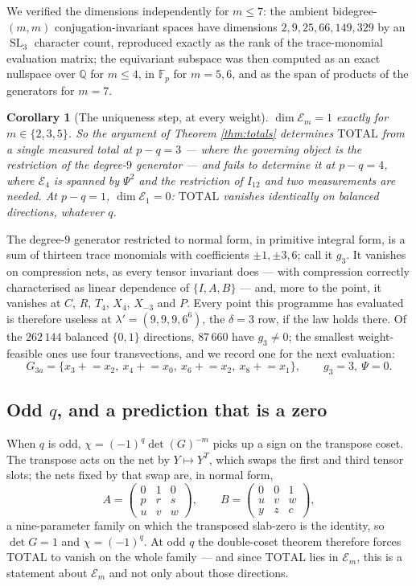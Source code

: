 \documentclass[11pt,reqno]{amsart}
\theoremstyle{plain}
\newtheorem{corollary}[theorem]{Corollary}
\theoremstyle{definition}
\DeclareMathOperator{\SL}{SL}
\begin{document}
We verified the dimensions independently for $m\le7$: the ambient bidegree-%
$(m,m)$ conjugation-invariant spaces have dimensions $2,9,25,66,149,329$ by an
$\SL_3$ character count, reproduced exactly as the rank of the trace-monomial
evaluation matrix; the equivariant subspace was then computed as an exact
nullspace over $\mathbb{Q}$ for $m\le4$, in $\mathbb{F}_p$ for $m=5,6$, and as the span of
products of the generators for $m=7$.

\begin{corollary}[The uniqueness step, at every weight]\label{cor:pquniq}
$\dim\mathcal E_m=1$ exactly for $m\in\{2,3,5\}$.  So the argument of Theorem
\ref{thm:totals} determines $\mathrm{TOTAL}$ from a single measured total at
$p-q=3$ --- where the governing object is the restriction of the degree-$9$
generator --- and fails to determine it at $p-q=4$, where $\mathcal E_4$ is
spanned by $\Psi^{2}$ and the restriction of $I_{12}$ and two measurements are
needed.  At $p-q=1$, $\dim\mathcal E_1=0$: $\mathrm{TOTAL}$ vanishes identically
on balanced directions, whatever $q$.
\end{corollary}

The degree-$9$ generator restricted to normal form, in primitive integral form,
is a sum of thirteen trace monomials with coefficients $\pm1,\pm3,6$; call it
$g_3$.  It vanishes on compression nets, as every tensor invariant does --- with
compression correctly characterised as linear dependence of $\{I,A,B\}$ --- and,
more to the point, it vanishes at $C$, $R$, $T_4$, $X_4$, $X_{-3}$ and $P$.
Every point this programme has evaluated is therefore useless at
$\lambda'=(9,9,9,6^{6})$, the $\delta=3$ row, if the law holds there.  Of the
$262\,144$ balanced $\{0,1\}$ directions, $87\,660$ have $g_3\neq0$; the smallest
weight-feasible ones use four transvections, and we record one for the next
evaluation:
\[
  G_{3a}=\{x_3\!+\!=\!x_2,\ x_4\!+\!=\!x_0,\ x_6\!+\!=\!x_2,\ x_8\!+\!=\!x_1\},
  \qquad g_3=3,\ \Psi=0 .
\]

\subsection*{Odd $q$, and a prediction that is a zero}

When $q$ is odd, $\chi=(-1)^{q}\det(G)^{-m}$ picks up a sign on the transpose
coset.  The transpose acts on the net by $Y\mapsto Y^{T}$, which swaps the first
and third tensor slots; the nets fixed by that swap are, in normal form,
\[
  A=\begin{pmatrix}0&1&0\\ p&r&s\\ u&v&w\end{pmatrix},\qquad
  B=\begin{pmatrix}0&0&1\\ u&v&w\\ y&z&c\end{pmatrix},
\]
a nine-parameter family on which the transposed slab-zero is the identity, so
$\det G=1$ and $\chi=(-1)^{q}$.  At odd $q$ the double-coset theorem therefore
forces $\mathrm{TOTAL}$ to vanish on the whole family --- and since
$\mathrm{TOTAL}$ lies in $\mathcal E_m$, this is a statement about $\mathcal E_m$
and not only about those directions.
\end{document}

